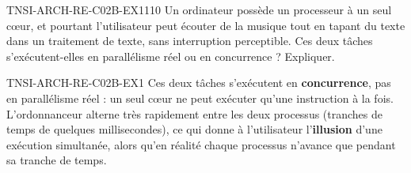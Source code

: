 
\begin{exercice}{TNSI-ARCH-RE-C02B-EX1}{1}{10}
Un ordinateur possède un processeur à un seul cœur, et pourtant l'utilisateur peut écouter de la musique tout en tapant du texte dans un traitement de texte, sans interruption perceptible. Ces deux tâches s'exécutent-elles en parallélisme réel ou en concurrence ? Expliquer.
\end{exercice}


\begin{corrige}{TNSI-ARCH-RE-C02B-EX1}
Ces deux tâches s'exécutent en \textbf{concurrence}, pas en parallélisme réel : un seul cœur ne peut exécuter qu'une instruction à la fois. L'ordonnanceur alterne très rapidement entre les deux processus (tranches de temps de quelques millisecondes), ce qui donne à l'utilisateur l'\textbf{illusion} d'une exécution simultanée, alors qu'en réalité chaque processus n'avance que pendant sa tranche de temps.
\end{corrige}
